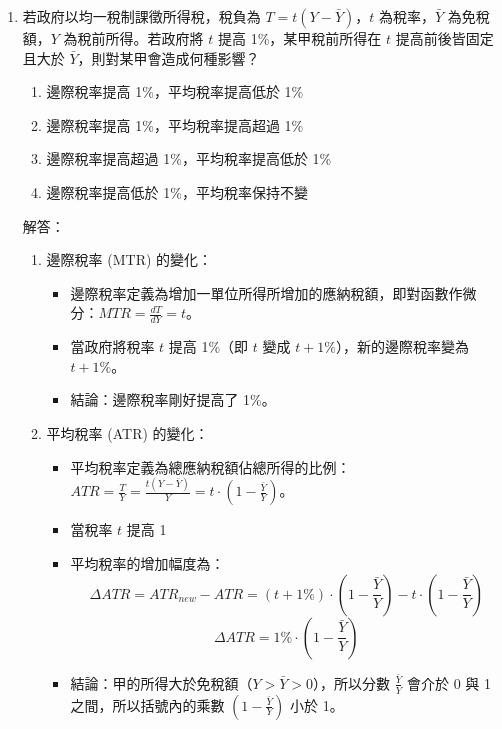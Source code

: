 \documentclass[12pt, a4paper]{article}
\begin{document}
\begin{enumerate}
    \item 若政府以均一稅制課徵所得稅，稅負為 \(T = t(Y - \bar{Y})\)，\(t\) 為稅率，\(\bar{Y}\) 為免稅額，\(Y\) 為稅前所得。若政府將 \(t\) 提高 1\%，某甲稅前所得在 \(t\) 提高前後皆固定且大於 \(\bar{Y}\)，則對某甲會造成何種影響？
    \begin{enumerate}[label=\Alph*.]
        \item 邊際稅率提高 1\%，平均稅率提高低於 1\%
        \item 邊際稅率提高 1\%，平均稅率提高超過 1\%
        \item 邊際稅率提高超過 1\%，平均稅率提高低於 1\%
        \item 邊際稅率提高低於 1\%，平均稅率保持不變
    \end{enumerate}
    解答：
    \begin{enumerate}[1.]
        \item 邊際稅率 (MTR) 的變化：
        \begin{itemize}
            \item 邊際稅率定義為增加一單位所得所增加的應納稅額，即對函數作微分：\(MTR = \frac{dT}{dY} = t\)。
            \item 當政府將稅率 \(t\) 提高 1\%（即 \(t\) 變成 \(t + 1\%\)），新的邊際稅率變為 \(t + 1\%\)。
            \item 結論：邊際稅率剛好提高了 1\%。
        \end{itemize}
        \item 平均稅率 (ATR) 的變化：
        \begin{itemize}
            \item 平均稅率定義為總應納稅額佔總所得的比例：\(ATR = \frac{T}{Y} = \frac{t(Y - \bar{Y})}{Y} = t \cdot (1 - \frac{\bar{Y}}{Y})\)。
            \item 當稅率 \(t\) 提高 1%
            \item 平均稅率的增加幅度為：
            \[
            \Delta ATR = ATR_{new} - ATR = (t + 1\%) \cdot (1 - \frac{\bar{Y}}{Y}) - t \cdot (1 - \frac{\bar{Y}}{Y})
            \]
            \[
            \Delta ATR = 1\% \cdot (1 - \frac{\bar{Y}}{Y})
            \]
            \item 結論：甲的所得大於免稅額（\(Y > \bar{Y} > 0\)），所以分數 \(\frac{\bar{Y}}{Y}\) 會介於 0 與 1 之間，所以括號內的乘數 \((1 - \frac{\bar{Y}}{Y})\) 小於 1。
        \end{itemize}
    \end{enumerate}


\end{enumerate}
\end{document}

